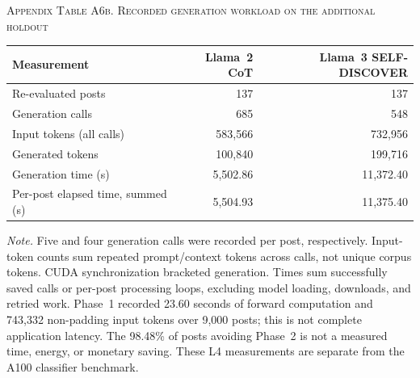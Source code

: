 \documentclass{ieeeaccess}
\begin{document}
\par\medskip
{}
\noindent\textsc{Appendix Table A6b. Recorded generation workload on the additional holdout}\par
\smallskip
\small
\noindent\begin{tabularx}{\textwidth}{@{}Y r r@{}}
\toprule
Measurement & Llama~2 CoT & Llama~3 SELF-DISCOVER \\
\midrule
Re-evaluated posts & 137 & 137 \\
Generation calls & 685 & 548 \\
Input tokens (all calls) & 583,566 & 732,956 \\
Generated tokens & 100,840 & 199,716 \\
Generation time (s) & 5,502.86 & 11,372.40 \\
Per-post elapsed time, summed (s) & 5,504.93 & 11,375.40 \\
\bottomrule
\end{tabularx}
\par\smallskip
\noindent\footnotesize\textit{Note.} Five and four generation calls were recorded per post, respectively. Input-token counts sum repeated prompt/context tokens across calls, not unique corpus tokens. CUDA synchronization bracketed generation. Times sum successfully saved calls or per-post processing loops, excluding model loading, downloads, and retried work. Phase~1 recorded 23.60 seconds of forward computation and 743,332 non-padding input tokens over 9,000 posts; this is not complete application latency. The 98.48\% of posts avoiding Phase~2 is not a measured time, energy, or monetary saving. These L4 measurements are separate from the A100 classifier benchmark.\normalsize

\EOD
\end{document}
